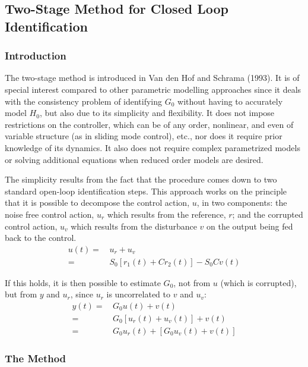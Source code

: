 \documentclass[  10pt, twoside]{report} %
\numberwithin{equation}{chapter}
\begin{document}
\subsection{Two-Stage Method for Closed Loop Identification}\label{Two-Stage Method}
\subsubsection{Introduction}
\hspace{\parindent}The two-stage method is introduced in Van den Hof and Schrama (1993). It is of special interest compared to other parametric modelling approaches since it deals with the consistency problem of identifying $G_0$ without having to accurately model $H_0$, but also due to its simplicity and flexibility. It does not impose restrictions on the controller, which can be of any order, nonlinear, and even of variable structure (as in sliding mode control), etc., nor does it require prior knowledge of its dynamics. It also does not require complex parametrized models or solving additional equations when reduced order models are desired.

The simplicity results from the fact that the procedure comes down to two standard open-loop identification steps. This approach works on the principle that it is possible to decompose the control action, $u$, in two components: the noise free control action, $u_r$ which results from the reference, $r$; and the corrupted control action, $u_v$ which results from the disturbance $v$ on the output being fed back to the control.
\begin{align}
    u(t) =& \, u_r + u_v  \\
         =& \, S_0 \left[ r_{1}(t) + C r_{2}(t) \right] - S_0 C v(t) 
\end{align}

If this holds, it is then possible to estimate $G_0$, not from $u$ (which is corrupted), but from $y$ and $u_r$, since $u_r$ is uncorrelated to $v$ and $u_v$:
\begin{align}
    y(t) =& \, G_0 u(t) + v(t) \nonumber \\ 
         =& \, G_0 \left[u_{r}(t) + u_{v}(t) \right] + v(t)  \nonumber\\ 
         =& \, G_0 u_{r}(t) + \left[G_0 u_v(t) + v(t) \right]
\end{align}

\subsubsection{The Method} 
\end{document}
